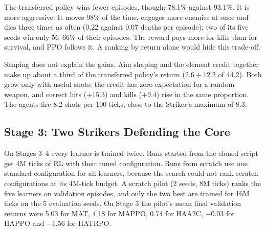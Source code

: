 \documentclass[11pt]{article}
\begin{document}
The transferred policy wins fewer episodes, though: 78.1\% against 93.1\%. It is more aggressive. It moves 98\% of the time, engages more enemies at once and dies three times as often (0.22 against 0.07 deaths per episode); two of its five seeds win only 56--66\% of their episodes. The reward pays more for kills than for survival, and PPO follows it. A ranking by return alone would hide this trade-off.

Shaping does not explain the gains. Aim shaping and the element credit together make up about a third of the transferred policy's return ($2.6 + 12.2$ of $44.2$). Both grow only with useful shots: the credit has zero expectation for a random weapon, and correct hits ($+15.3$) and kills ($+9.4$) rise in the same proportion. The agents fire 8.2 shots per 100 ticks, close to the Striker's maximum of 8.3.

\subsection{Stage 3: Two Strikers Defending the Core}
\label{sec:results-stage3}

On Stages 3--4 every learner is trained twice. Runs started from the cloned script get 4M ticks of RL with their tuned configuration. Runs from scratch use one standard configuration for all learners, because the search could not rank scratch configurations at its 4M-tick budget. A scratch pilot (2 seeds, 8M ticks) ranks the five learners on validation episodes, and only the two best are trained for 16M ticks on the 5 evaluation seeds. On Stage 3 the pilot's mean final validation returns were 5.03 for MAT, 4.18 for MAPPO, 0.74 for HAA2C, $-0.03$ for HAPPO and $-1.56$ for HATRPO.
\end{document}
